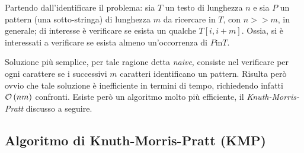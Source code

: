 \documentclass{subfiles}
\begin{document}
Partendo dall'identificare il problema: sia \(T\) un testo di lunghezza \(n\) e sia \(P\) un pattern (una sotto-stringa) di lunghezza \(m\) da ricercare in \(T\),
con \(n >> m\), in generale; di interesse è verificare se esista un qualche \(T[i, i + m]\).
Ossia, si è interessati a verificare se esista almeno un'occorrenza di \(P \text{in} T\).

Soluzione più semplice, per tale ragione detta \emph{naive}, consiste nel verificare per ogni carattere se i successivi \(m\) caratteri identificano un pattern.
Risulta però ovvio che tale soluzione è inefficiente in termini di tempo, richiedendo infatti \(\operatorname{\mathcal{O}} \left(nm\right)\) confronti.
Esiste però un algoritmo molto più efficiente, il \emph{Knuth-Morris-Pratt} discusso a seguire.

\subsection{Algoritmo di Knuth-Morris-Pratt (KMP)}

\end{document}
